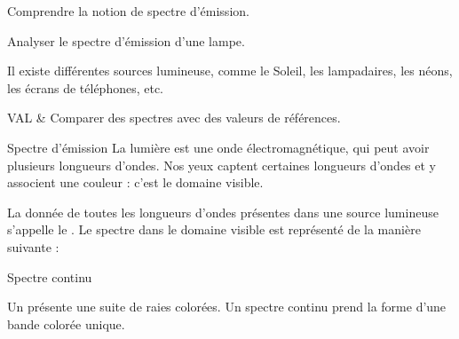 \teteSndLumi

\vspace*{-36pt}


\begin{objectifs}
  \item Comprendre la notion de spectre d'émission.
  \item Analyser le spectre d'émission d'une lampe.
\end{objectifs}

\begin{contexte}
  Il existe différentes sources lumineuse, comme le Soleil, les lampadaires, les néons, les écrans de téléphones, etc.
  
\end{contexte}


\begin{tableauCompetences}
  VAL & Comparer des spectres avec des valeurs de références. \\
\end{tableauCompetences}


\begin{doc}{Spectre d'émission}
  La lumière est une onde électromagnétique, qui peut avoir plusieurs longueurs d'ondes.
  Nos yeux captent certaines longueurs d'ondes et y associent une couleur : c'est le domaine visible.
  
  \begin{importants}
    La donnée de toutes les longueurs d'ondes présentes dans une source lumineuse s'appelle le .
    Le spectre dans le domaine visible est représenté de la manière suivante :
  \end{importants}
  
  \begin{center}
  \end{center}
\end{doc}



\begin{doc}{Spectre continu}
  \begin{importants}
    Un  présente une suite de raies colorées.
    Un spectre continu prend la forme d'une bande colorée unique.
  \end{importants}
\end{doc}

